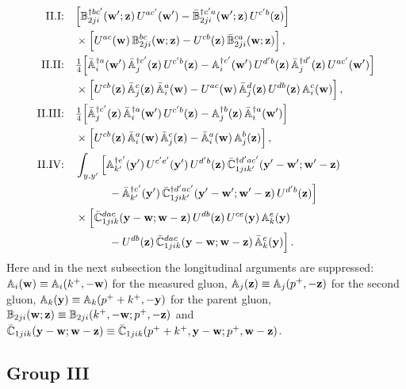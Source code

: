 \begin{align}
\text{II.I:}\quad&\Big[\mathbb{B}^{\dagger bc'}_{2ji}(\mathbf{w}';\mathbf{z})\,U^{ac'}(\mathbf{w}')-\bar{\mathbb{B}}^{\dagger c'a}_{2ji}(\mathbf{w}';\mathbf{z})\,U^{c'b}(\mathbf{z})\Big]\notag\\&\times\Big[U^{ac}(\mathbf{w})\,\mathbb{B}^{bc}_{2ji}(\mathbf{w};\mathbf{z})-U^{cb}(\mathbf{z})\,\bar{\mathbb{B}}^{ca}_{2ji}(\mathbf{w};\mathbf{z})\Big]\,,\notag\\
\text{II.II:}\quad&\tfrac14\Big[\bar{\mathbb{A}}^{\dagger a}_i(\mathbf{w}')\,\bar{\mathbb{A}}^{\dagger c'}_j(\mathbf{z})\,U^{c'b}(\mathbf{z})-\mathbb{A}^{\dagger c'}_i(\mathbf{w}')\,U^{d'b}(\mathbf{z})\,\bar{\mathbb{A}}^{\dagger d'}_j(\mathbf{z})\,U^{ac'}(\mathbf{w}')\Big]\notag\\
&\times\Big[U^{cb}(\mathbf{z})\,\bar{\mathbb{A}}^c_j(\mathbf{z})\,\bar{\mathbb{A}}^a_i(\mathbf{w})-U^{ac}(\mathbf{w})\,\bar{\mathbb{A}}^d_j(\mathbf{z})\,U^{db}(\mathbf{z})\,\mathbb{A}^c_i(\mathbf{w})\Big]\,,\notag\\
\text{II.III:}\quad&\tfrac14\Big[\bar{\mathbb{A}}^{\dagger c'}_j(\mathbf{z})\,\bar{\mathbb{A}}^{\dagger a}_i(\mathbf{w}')\,U^{c'b}(\mathbf{z})-\mathbb{A}^{\dagger b}_j(\mathbf{z})\,\bar{\mathbb{A}}^{\dagger a}_i(\mathbf{w}')\Big]\notag\\&\times\Big[U^{cb}(\mathbf{z})\,\bar{\mathbb{A}}^a_i(\mathbf{w})\,\bar{\mathbb{A}}^c_j(\mathbf{z})-\bar{\mathbb{A}}^a_i(\mathbf{w})\,\mathbb{A}^b_j(\mathbf{z})\Big]\,,\notag\\
\text{II.IV:}\quad&\int_{y,y'}\Big[\mathbb{A}^{\dagger e'}_{k'}(\mathbf{y}')\,U^{c'e'}(\mathbf{y}')\,U^{d'b}(\mathbf{z})\,\bar{\mathbb{C}}^{\dagger d'ac'}_{1jik'}(\mathbf{y}'-\mathbf{w}';\mathbf{w}'-\mathbf{z})\notag\\&\qquad\quad-\bar{\mathbb{A}}^{\dagger c'}_{k'}(\mathbf{y}')\,\bar{\mathbb{C}}^{\dagger d'ac'}_{1jik'}(\mathbf{y}'-\mathbf{w}';\mathbf{w}'-\mathbf{z})\,U^{d'b}(\mathbf{z})\Big]\notag\\
&\times\Big[\bar{\mathbb{C}}^{dac}_{1jik}(\mathbf{y}-\mathbf{w};\mathbf{w}-\mathbf{z})\,U^{db}(\mathbf{z})\,U^{ce}(\mathbf{y})\,\mathbb{A}^e_k(\mathbf{y})\notag\\&\qquad\quad-U^{db}(\mathbf{z})\,\bar{\mathbb{C}}^{dac}_{1jik}(\mathbf{y}-\mathbf{w};\mathbf{w}-\mathbf{z})\,\bar{\mathbb{A}}^c_k(\mathbf{y})\Big]\,.\label{eq:GroupIIexplicit}
\end{align}
Here and in the next subsection the longitudinal arguments are suppressed: $\mathbb{A}_i(\mathbf{w})\equiv\mathbb{A}_i(k^+,-\mathbf{w})$ for the measured gluon, $\mathbb{A}_j(\mathbf{z})\equiv\mathbb{A}_j(p^+,-\mathbf{z})$ for the second gluon, $\mathbb{A}_k(\mathbf{y})\equiv\mathbb{A}_k(p^++k^+,-\mathbf{y})$ for the parent gluon, $\mathbb{B}_{2ji}(\mathbf{w};\mathbf{z})\equiv\mathbb{B}_{2ji}(k^+,-\mathbf{w};p^+,-\mathbf{z})$ and $\bar{\mathbb{C}}_{1jik}(\mathbf{y}-\mathbf{w};\mathbf{w}-\mathbf{z})\equiv\bar{\mathbb{C}}_{1jik}(p^++k^+,\mathbf{y}-\mathbf{w};p^+,\mathbf{w}-\mathbf{z})$.

\subsection{Group III}

